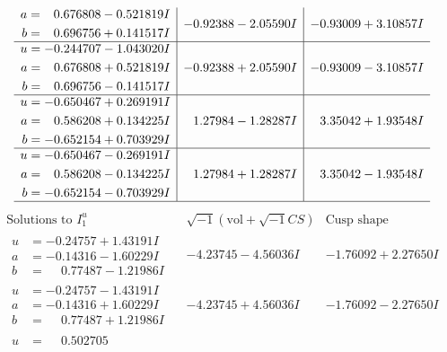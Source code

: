 \documentclass[1p]{elsarticle_modified}
\theoremstyle{definition}
\newcommand{\I}{\sqrt{-1}}
\begin{document}
$$\begin{array}{c|c|c}
\begin{aligned}
a &= \phantom{-}0.676808 - 0.521819 I \\
b &= \phantom{-}0.696756 + 0.141517 I\end{aligned}
 & -0.92388 - 2.05590 I & -0.93009 + 3.10857 I \\ \hline\begin{aligned}
u &= -0.244707 - 1.043020 I \\
a &= \phantom{-}0.676808 + 0.521819 I \\
b &= \phantom{-}0.696756 - 0.141517 I\end{aligned}
 & -0.92388 + 2.05590 I & -0.93009 - 3.10857 I \\ \hline\begin{aligned}
u &= -0.650467 + 0.269191 I \\
a &= \phantom{-}0.586208 + 0.134225 I \\
b &= -0.652154 + 0.703929 I\end{aligned}
 & \phantom{-}1.27984 - 1.28287 I & \phantom{-}3.35042 + 1.93548 I \\ \hline\begin{aligned}
u &= -0.650467 - 0.269191 I \\
a &= \phantom{-}0.586208 - 0.134225 I \\
b &= -0.652154 - 0.703929 I\end{aligned}
 & \phantom{-}1.27984 + 1.28287 I & \phantom{-}3.35042 - 1.93548 I\\
 \hline 
 \end{array}$$\newpage$$\begin{array}{c|c|c}  
\text{Solutions to }I^u_{1}& \I (\text{vol} + \sqrt{-1}CS) & \text{Cusp shape}\\
 \hline 
\begin{aligned}
u &= -0.24757 + 1.43191 I \\
a &= -0.14316 - 1.60229 I \\
b &= \phantom{-}0.77487 - 1.21986 I\end{aligned}
 & -4.23745 - 4.56036 I & -1.76092 + 2.27650 I \\ \hline\begin{aligned}
u &= -0.24757 - 1.43191 I \\
a &= -0.14316 + 1.60229 I \\
b &= \phantom{-}0.77487 + 1.21986 I\end{aligned}
 & -4.23745 + 4.56036 I & -1.76092 - 2.27650 I \\ \hline\begin{aligned}
u &= \phantom{-}0.502705\phantom{ +0.000000I} \\

\end{aligned}
\end{array}$$
\end{document}
